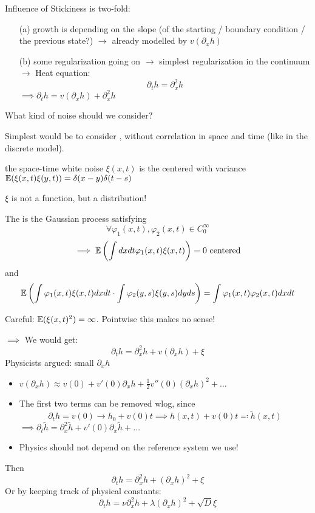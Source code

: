 Influence of Stickiness is two-fold:
\begin{enumerate}
    \item[(a)] growth is depending on the slope (of the starting / boundary condition / the previous state?) $\to$ already modelled by $v(\partial_x h)$
    \item[(b)] some regularization going on $\to $ simplest regularization in the continuum $\to$ Heat equation:\[\partial_t h =\partial_x^2h\]
                $\implies \partial_t h=v(\partial_x h)+\partial_x^2 h$ 
\end{enumerate}

 What kind of noise should we consider?

Simplest would be to consider , without correlation in space and time (like in the discrete model). 

 the space-time white noise $\xi(x,t)$ is the centered  with 
variance $\mathbb{E}(\xi(x,t)\xi(y,t))=\delta(x-y)\delta(t-s)$

\begin{aremark}[WARNING]
    $\xi$ is not a function, but a distribution!
\end{aremark}

\begin{definition}\label{def:5.1}
    The  is the Gaussian process satisfying 
    \[\forall \varphi_1(x,t),\varphi_2(x,t)\in C_0^\infty\]
    \begin{align*}
        \implies \mathbb{E}\left(\int dxdt \varphi_1(x,t)\xi(x,t)\right)=0 \text{ centered}
    \end{align*}
    and 
    \[\mathbb{E}\left(\int\varphi_1 (x,t)\xi(x,t)dxdt\cdot\int\varphi_2(y,s)\xi(y,s)dyds\right)=\int \varphi_1(x,t)\varphi_2(x,t)dxdt\]
\end{definition}

\begin{aremark}
    Careful: $\mathbb{E}(\xi(x,t)^2)=\infty$. Pointwise this makes no sense!
\end{aremark}

$\implies$ We would get:
\[\partial_t h = \partial_x^2 h + v(\partial_x h)+\xi\]
Physicists argued: small $\partial_x h$
\begin{itemize}
    \item $v(\partial_x h)\approx v(0)+v'(0)\partial_x h + \frac{1}{2}v''(0)(\partial_x h)^2 +\dots$
    \item The first two terms can be removed wlog, since \[\partial_t h = v(0)\to h_0+v(0)t\implies h(x,t)+v(0)t\eqqcolon \tilde{h}(x,t)\]
        $\implies \partial_t\tilde{h} = \partial_x^2 \tilde{h}+ v'(0)\partial_x \tilde{h}+\dots$
    \item Physics should not depend on the reference system we use!    
\end{itemize}
Then 
\[\partial_t h = \partial_x^2 h +(\partial_x h)^2 +\xi\]
Or by keeping track of physical constants:
\[\partial_t h = \nu\partial_x^2 h +\lambda(\partial_x h)^2 +\sqrt{D}\xi\]

